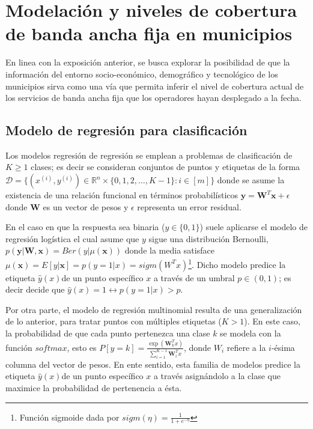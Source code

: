 \documentclass[9pt,twocolumn,twoside]{ilcss}
\begin{document}

\section{Modelación y niveles de cobertura de banda ancha fija en municipios}

En linea con la exposición anterior, se busca explorar la posibilidad de que la información del entorno socio-económico, demográfico y tecnológico de los municipios sirva como una vía que permita inferir el nivel de cobertura actual de los servicios de banda ancha fija que los operadores hayan desplegado a la fecha.

\subsection{Modelo de regresión para clasificación}

Los modelos regresión de regresión se emplean a problemas de clasificación de $K\geq 1$ clases; es decir se consideran conjuntos de puntos y etiquetas de la forma ${\mathcal D} =\{(x^{(i)}, y^{(i)}) \in \mathbb{R}^n \times \{0,1,2, \ldots, K-1\}: i\in [m] \}$ donde se asume la existencia de una relación funcional en términos probabilísticos $\mathbf{y} = \mathbf{W}^T \mathbf{x} + \epsilon$ donde $\mathbf{W}$ es un vector de pesos y $\epsilon$ representa un error residual.

En el caso en que la respuesta sea binaria ($y\in \{0,1\}$) suele aplicarse el modelo de regresión logística el cual asume que $y$ sigue una distribución Bernoulli, $p(\mathbf{y}| \mathbf{W}, \mathbf{x})= Ber(y|\mu(\mathbf{x}))$ donde la media satisface $\mu(\mathbf{x}) = E[y | \mathbf{x}] = p(y=1|x) =sigm(W^Tx)$\footnote{Función sigmoide dada por $sigm(\eta) = \frac{1}{1+ e^{-\eta}}$}. Dicho modelo predice la etiqueta $\hat{y}(x)$de un punto específico $x$ a través de un umbral $p\in (0,1)$; es decir decide que $\hat{y}(x)=1 \leftrightarrow p(y=1|x)>p$.

Por otra parte, el modelo de regresión multinomial resulta de una generalización de lo anterior, para tratar puntos con múltiples etiquetas ($K>1$). En este caso, la probabilidad de que cada punto pertenezca una clase $k$ se modela con la función $softmax$, esto es $P[y=k] = \frac{\exp(\mathbf{W}_k^T x )}{\sum_{i=1}^{K-1}\mathbf{W}_i^T x}$, donde $W_i$ refiere a la $i$-ésima columna del vector de pesos. En ente sentido, esta familia de modelos predice la etiqueta $\hat{y}(x)$de un punto específico $x$ a través asignándolo a la clase que maximice la probabilidad de pertenencia a ésta.
\end{document}
